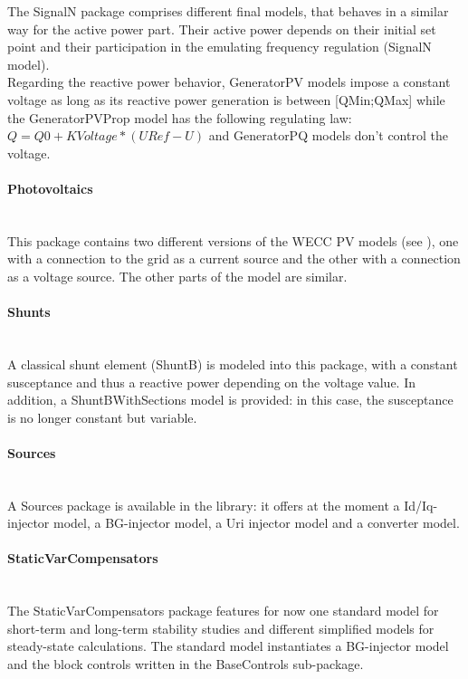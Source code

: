 \documentclass[a4paper, 12pt]{report}
\begin{document}
The SignalN package comprises different final models, that behaves in a similar way for the active power part. Their active power depends on their initial set point and their participation in the emulating frequency regulation (SignalN model). \\ Regarding the reactive power behavior, GeneratorPV models impose a constant voltage as long as its reactive power generation is between [QMin;QMax] while the GeneratorPVProp model has the following regulating law: $Q = Q0 + KVoltage * (URef - U)$ and GeneratorPQ models don't control the voltage.

\paragraph{Photovoltaics}
~~\\

This package contains two different versions of the \ac{WECC} PV models (see \cite{WECC}), one with a connection to the grid as a current source and the other with a connection as a voltage source. The other parts of the model are similar.

\paragraph{Shunts}
~~\\

A classical shunt element (ShuntB) is modeled into this package, with a constant susceptance and thus a reactive power depending on the voltage value. In addition, a ShuntBWithSections model is provided: in this case, the susceptance is no longer constant but variable.

\paragraph{Sources}
~~\\

A Sources package is available in the library: it offers at the moment a Id/Iq-injector model, a BG-injector model, a Uri injector model and a converter model.

\paragraph{StaticVarCompensators}
~~\\

The StaticVarCompensators package features for now one standard model for short-term and long-term stability studies and different simplified models for steady-state calculations. The standard model instantiates a BG-injector model and the block controls written in the BaseControls sub-package.
\end{document}
